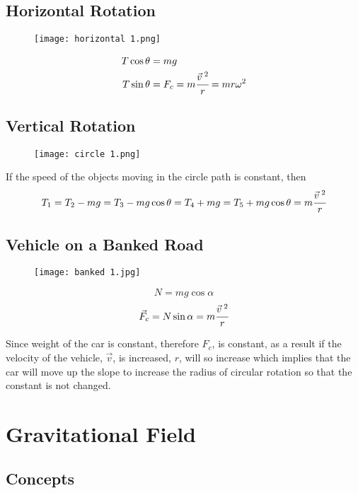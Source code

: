 \documentclass{article}
\begin{document}
    \subsection{Horizontal Rotation}
   
    
\begin{figure}[H]
    \centering
    \texttt{[image: horizontal 1.png]}
    
\end{figure}
\begin{align*}
    T \cos \theta &=mg \\ T\sin \theta &= F_c= m\cfrac{\vec{v}^{\; 2}}{r}=mr\omega^2
\end{align*}

\newpage

  \subsection{Vertical Rotation}

 \begin{figure}[H]
 \centering
 \texttt{[image: circle 1.png]}
 \end{figure}
If the speed of the objects moving in the circle path is constant, then 
$$T_1=T_2-mg=T_3-mg \cos\theta=T_4+mg=T_5+mg \cos \theta=m\cfrac{\vec{v}^{\; 2}}{r}$$



     \subsection{Vehicle on a Banked Road}


\begin{figure}[H]
\centering
\texttt{[image: banked 1.jpg]}
\end{figure}

$$N=mg \cos \alpha $$
$$\vec{F}_c= N\sin \alpha=m\cfrac{\vec{v}^{\; 2}}{r}$$

Since weight of the car is constant, therefore $F_c$, is constant, as a result if the velocity of the vehicle, $\vec{v}$, is increased, $r$, will so increase which implies that the car will move up the slope to increase the radius of circular rotation so that the constant is not changed.
\newpage
\section{Gravitational Field}

     \subsection{Concepts}
\end{document}
